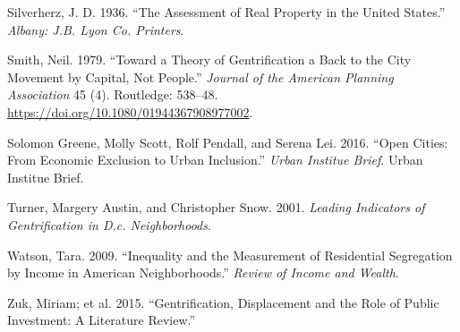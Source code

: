 \documentclass[12pt,]{article}
\begin{document}
\leavevmode\hypertarget{ref-Silverherz1936}{}%
Silverherz, J. D. 1936. ``The Assessment of Real Property in the United
States.'' \emph{Albany: J.B. Lyon Co. Printers}.

\leavevmode\hypertarget{ref-Smith1979}{}%
Smith, Neil. 1979. ``Toward a Theory of Gentrification a Back to the
City Movement by Capital, Not People.'' \emph{Journal of the American
Planning Association} 45 (4). Routledge: 538--48.
\url{https://doi.org/10.1080/01944367908977002}.

\leavevmode\hypertarget{ref-urban2016}{}%
Solomon Greene, Molly Scott, Rolf Pendall, and Serena Lei. 2016. ``Open
Cities: From Economic Exclusion to Urban Inclusion.'' \emph{Urban
Institue Brief}. Urban Institue Brief.

\leavevmode\hypertarget{ref-Turner2001}{}%
Turner, Margery Austin, and Christopher Snow. 2001. \emph{Leading
Indicators of Gentrification in D.c. Neighborhoods}.

\leavevmode\hypertarget{ref-Watson2009}{}%
Watson, Tara. 2009. ``Inequality and the Measurement of Residential
Segregation by Income in American Neighborhoods.'' \emph{Review of
Income and Wealth}.

\leavevmode\hypertarget{ref-Zuk2015}{}%
Zuk, Miriam; et al. 2015. ``Gentrification, Displacement and the Role of
Public Investment: A Literature Review.''
\end{document}
